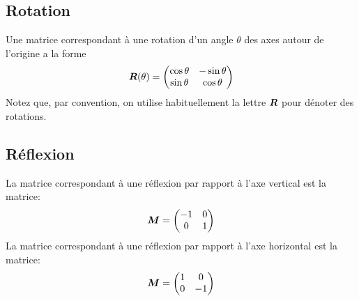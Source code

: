 \subsection{Rotation}
Une matrice correspondant à une rotation d'un angle $\theta$ des axes autour de l'origine a la forme
\[
\boldsymbol{R}(\theta) = \begin{pmatrix}
\cos\theta & -\sin\theta \\
\sin\theta & \cos\theta
\end{pmatrix}
\]
Notez que, par convention, on utilise habituellement la lettre $\boldsymbol{R}$ pour dénoter des rotations.


\subsection{Réflexion}
La matrice correspondant à une réflexion par rapport à l'axe vertical
est la matrice:
\[
\boldsymbol{M} = \begin{pmatrix}
-1 & 0 \\
0 & 1
\end{pmatrix} 
\]
La matrice correspondant à une réflexion par rapport à l'axe horizontal
est la matrice:
\[
\boldsymbol{M} = \begin{pmatrix}
1 & 0 \\
0 & -1
\end{pmatrix} 
\]

